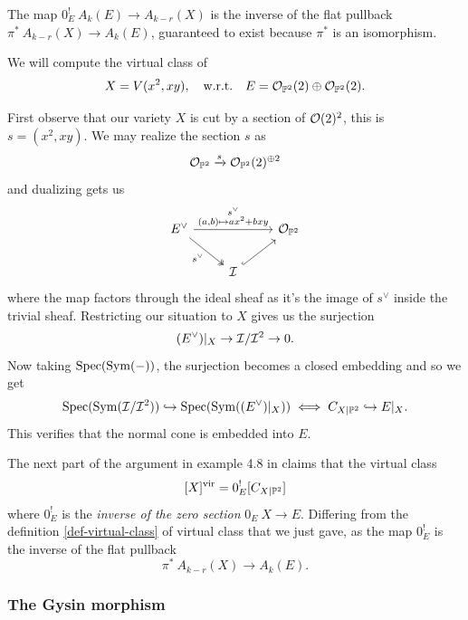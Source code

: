 \documentclass[12pt]{memoir}
\begin{document}
The map \(0^{!}_E\: A_{k}(E)\to A_{k-r}(X)\) is the inverse of the flat pullback \(\pi^{\ast}\: A_{k-r}(X)\to A_k(E)\), guaranteed to exist because \(\pi^\ast\) is an isomorphism.

\begin{Ex}
    We will compute the virtual class of
    \[
        X=V(x^2,xy),\quad\text{w.r.t.}\quad E=\mathcal{O}_{\mathbb{P}^2}(2)\oplus\mathcal{O}_{\mathbb{P}^2}(2).
    \]
\end{Ex}

\begin{ptcb}
    First observe that our variety \(X\) is cut by a section of \(\mathcal{O}(2)^{2}\), this is \(s=(x^2,xy)\). We may realize the section \(s\) as
    \[
        \mathcal{O}_{\mathbb{P}^2}\xrightarrow{s}\mathcal{O}_{\mathbb{P}^2}(2)^{\oplus 2}
    \]
    and dualizing gets us
    \[
        \begin{tikzcd}
            E^{\vee} \arrow[rr, "\substack{s^{\vee}\\(a,b)\mapsto ax^2+bxy}"] \arrow[rd, "s^{\vee}"', two heads] &                      & \cO_{\bP^2} \\
            & \cI \arrow[ru, hook] &
        \end{tikzcd}
    \]
    where the map factors through the ideal sheaf as it's the image of \(s^{\vee}\) inside the trivial sheaf. Restricting our situation to \(X\) gives us the surjection
    \[
        (E^\vee)|_X \to \mathcal{I}/\mathcal{I}^2 \to 0.
    \]
    Now taking \(\operatorname{Spec}(\operatorname{Sym}(-))\), the surjection becomes a closed embedding and so we get
    \[
        \operatorname{Spec}(\operatorname{Sym}(\mathcal{I}/\mathcal{I}^2))\hookrightarrow\operatorname{Spec}(\operatorname{Sym}((E^\vee)|_X))\iff C_{X|\mathbb{P}^2}\hookrightarrow E|_X.
    \]
    This verifies that the normal cone is embedded into \(E\).
\end{ptcb}


The next part of the argument in example 4.8 in \cite{VFCWorkMath} claims that the virtual class
\[
    [X]^{\mathrm{vir}}=0^{!}_{E}[C_{X|\mathbb{P}^2}]
\]
where \(0^{!}_{E}\) is the \emph{inverse of the zero section} \(0_E\:X\to E\). Differing from the definition \ref{def-virtual-class} of virtual class that we just gave, as the map \(0^{!}_{E}\) is the inverse of the flat pullback
\[
    \pi^\ast\: A_{k-r}(X)\to A_k(E).
\]

\subsubsection{The Gysin morphism}
\end{document}
